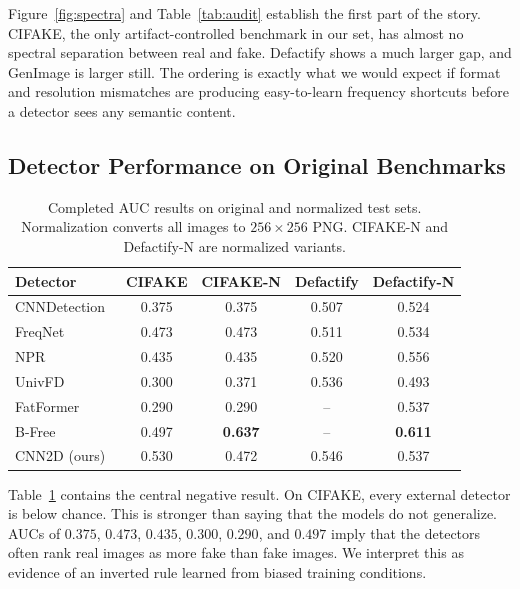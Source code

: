 Figure~\ref{fig:spectra} and Table~\ref{tab:audit} establish the first part of the story.
CIFAKE, the only artifact-controlled benchmark in our set, has almost no spectral separation between real and fake.
Defactify shows a much larger gap, and GenImage is larger still.
The ordering is exactly what we would expect if format and resolution mismatches are producing easy-to-learn frequency shortcuts before a detector sees any semantic content.

\subsection{Detector Performance on Original Benchmarks}
\label{sec:baseline}

\begin{table}[t]
\centering
\small
\setlength{\tabcolsep}{4pt}
\begin{tabular}{lcccc}
\toprule
\textbf{Detector} & \textbf{CIFAKE} & \textbf{CIFAKE-N} & \textbf{Defactify} & \textbf{Defactify-N} \\
\midrule
CNNDetection~\cite{wang2020cnn} & 0.375 & 0.375 & 0.507 & 0.524 \\
FreqNet~\cite{freqnet}          & 0.473 & 0.473 & 0.511 & 0.534 \\
NPR~\cite{npr}                  & 0.435 & 0.435 & 0.520 & 0.556 \\
UnivFD~\cite{univfd}            & 0.300 & 0.371 & 0.536 & 0.493 \\
FatFormer~\cite{fatformer}      & 0.290 & 0.290 & --    & 0.537 \\
B-Free~\cite{bfree}             & 0.497 & \textbf{0.637} & -- & \textbf{0.611} \\
CNN2D (ours)                    & 0.530 & 0.472 & 0.546 & 0.537 \\
\bottomrule
\end{tabular}
\caption{Completed AUC results on original and normalized test sets. Normalization converts all images to $256\times256$ PNG. CIFAKE-N and Defactify-N are normalized variants.}
\label{tab:perf}
\end{table}

Table~\ref{tab:perf} contains the central negative result.
On CIFAKE, every external detector is below chance.
This is stronger than saying that the models do not generalize.
AUCs of $0.375$, $0.473$, $0.435$, $0.300$, $0.290$, and $0.497$ imply that the detectors often rank real images as more fake than fake images.
We interpret this as evidence of an inverted rule learned from biased training conditions.

